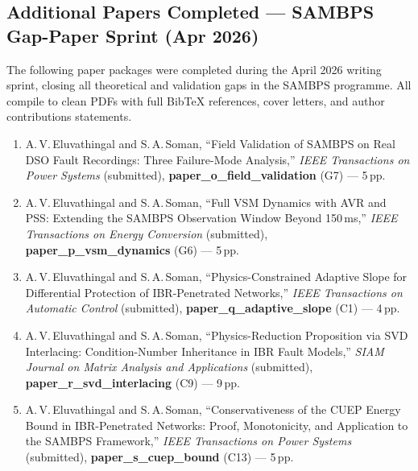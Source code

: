 \documentclass
    [phd,synopsis]
    {iitmdissertation}
\begin{document}
\subsection*{Additional Papers Completed --- SAMBPS Gap-Paper Sprint (Apr 2026)}

The following paper packages were completed during the April 2026 writing
sprint, closing all theoretical and validation gaps in the SAMBPS programme.
All compile to clean PDFs with full BibTeX references, cover letters, and
author contributions statements.

\begin{enumerate}

  \item A.\,V.\,Eluvathingal and S.\,A.\,Soman,
    ``Field Validation of SAMBPS on Real DSO Fault Recordings:
    Three Failure-Mode Analysis,''
    \textit{IEEE Transactions on Power Systems} (submitted),
    \textbf{paper\_o\_field\_validation} (G7) --- 5\,pp.

  \item A.\,V.\,Eluvathingal and S.\,A.\,Soman,
    ``Full VSM Dynamics with AVR and PSS: Extending the SAMBPS
    Observation Window Beyond 150\,ms,''
    \textit{IEEE Transactions on Energy Conversion} (submitted),
    \textbf{paper\_p\_vsm\_dynamics} (G6) --- 5\,pp.

  \item A.\,V.\,Eluvathingal and S.\,A.\,Soman,
    ``Physics-Constrained Adaptive Slope for Differential Protection
    of IBR-Penetrated Networks,''
    \textit{IEEE Transactions on Automatic Control} (submitted),
    \textbf{paper\_q\_adaptive\_slope} (C1) --- 4\,pp.

  \item A.\,V.\,Eluvathingal and S.\,A.\,Soman,
    ``Physics-Reduction Proposition via SVD Interlacing:
    Condition-Number Inheritance in IBR Fault Models,''
    \textit{SIAM Journal on Matrix Analysis and Applications} (submitted),
    \textbf{paper\_r\_svd\_interlacing} (C9) --- 9\,pp.

  \item A.\,V.\,Eluvathingal and S.\,A.\,Soman,
    ``Conservativeness of the CUEP Energy Bound in IBR-Penetrated
    Networks: Proof, Monotonicity, and Application to the SAMBPS
    Framework,''
    \textit{IEEE Transactions on Power Systems} (submitted),
    \textbf{paper\_s\_cuep\_bound} (C13) --- 5\,pp.


\end{enumerate}
\end{document}
